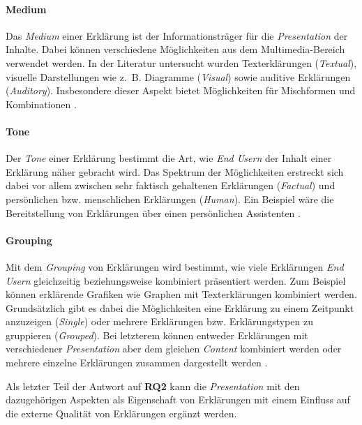 \paragraph{Medium} Das \textit{Medium} einer Erklärung ist der Informationsträger für die \textit{Presentation} der Inhalte. Dabei können verschiedene Möglichkeiten aus dem Multimedia-Bereich verwendet werden. In der Literatur untersucht wurden Texterklärungen (\textit{Textual}), visuelle Darstellungen wie z.~B. Diagramme (\textit{Visual}) sowie auditive Erklärungen (\textit{Auditory}). Insbesondere dieser Aspekt bietet Möglichkeiten für Mischformen und Kombinationen \cite{kouki_user_2017}.

\paragraph{Tone} Der \textit{Tone} einer Erklärung bestimmt die Art, wie \textit{End Usern} der Inhalt einer Erklärung näher gebracht wird. Das Spektrum der Möglichkeiten erstreckt sich dabei vor allem zwischen sehr faktisch gehaltenen Erklärungen (\textit{Factual}) und persönlichen bzw. menschlichen Erklärungen (\textit{Human}). Ein Beispiel wäre die Bereitstellung von Erklärungen über einen persönlichen Assistenten \cite{schaffer_i_2019}.

\paragraph{Grouping} Mit dem \textit{Grouping} von Erklärungen wird bestimmt, wie viele Erklärungen \textit{End Usern} gleichzeitig beziehungsweise kombiniert präsentiert werden. Zum Beispiel können erklärende Grafiken wie Graphen mit Texterklärungen kombiniert werden. Grundsätzlich gibt es dabei die Möglichkeiten eine Erklärung zu einem Zeitpunkt anzuzeigen (\textit{Single}) oder mehrere Erklärungen bzw. Erklärungstypen zu gruppieren (\textit{Grouped}). Bei letzterem können entweder Erklärungen mit verschiedener \textit{Presentation} aber dem gleichen \textit{Content} kombiniert werden \cite{kouki_user_2017} oder mehrere einzelne Erklärungen zusammen dargestellt werden \cite{balog_measuring_2020}.

\bigskip

Als letzter Teil der Antwort auf \textbf{RQ2} kann die \textit{Presentation} mit den dazugehörigen Aspekten als Eigenschaft von Erklärungen mit einem Einfluss auf die externe Qualität von Erklärungen ergänzt werden.

\newpage

